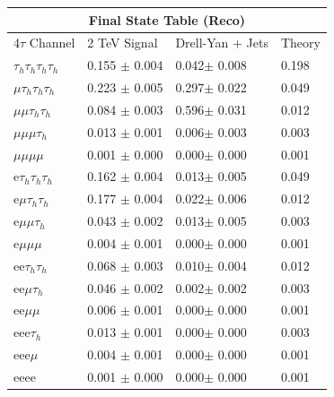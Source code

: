 \documentclass{article}
\begin{document}
 
\begin{landscape} 
\centering 
\begin{tabular}{|p{4.5cm}|p{3cm}|p{3cm}|p{3cm}|}\hline 
\multicolumn{4}{|c|}{Final State Table (Reco)} \\ 
\hline 
4$\tau$ Channel & 2 TeV Signal & Drell-Yan + Jets & Theory \\ 
\hline 
$\tau_h$$\tau_h$$\tau_h$$\tau_h$ & 0.155 $\pm$ 0.004 & 0.042$\pm$ 0.008 & 0.198\\
\hline 
$\mu$$\tau_h$$\tau_h$$\tau_h$ & 0.223 $\pm$ 0.005 & 0.297$\pm$ 0.022 & 0.049\\
\hline 
$\mu$$\mu$$\tau_h$$\tau_h$ & 0.084 $\pm$ 0.003 & 0.596$\pm$ 0.031 & 0.012\\
\hline 
$\mu$$\mu$$\mu$$\tau_h$ & 0.013 $\pm$ 0.001 & 0.006$\pm$ 0.003 & 0.003\\
\hline 
$\mu$$\mu$$\mu$$\mu$ & 0.001 $\pm$ 0.000 & 0.000$\pm$ 0.000 & 0.001\\
\hline 
e$\tau_h$$\tau_h$$\tau_h$ & 0.162 $\pm$ 0.004 & 0.013$\pm$ 0.005 & 0.049\\
\hline 
e$\mu$$\tau_h$$\tau_h$ & 0.177 $\pm$ 0.004 & 0.022$\pm$ 0.006 & 0.012\\
\hline 
e$\mu$$\mu$$\tau_h$ & 0.043 $\pm$ 0.002 & 0.013$\pm$ 0.005 & 0.003\\
\hline 
e$\mu$$\mu$$\mu$ & 0.004 $\pm$ 0.001 & 0.000$\pm$ 0.000 & 0.001\\
\hline 
ee$\tau_h$$\tau_h$ & 0.068 $\pm$ 0.003 & 0.010$\pm$ 0.004 & 0.012\\
\hline 
ee$\mu$$\tau_h$ & 0.046 $\pm$ 0.002 & 0.002$\pm$ 0.002 & 0.003\\
\hline 
ee$\mu$$\mu$ & 0.006 $\pm$ 0.001 & 0.000$\pm$ 0.000 & 0.001\\
\hline 
eee$\tau_h$ & 0.013 $\pm$ 0.001 & 0.000$\pm$ 0.000 & 0.003\\
\hline 
eee$\mu$ & 0.004 $\pm$ 0.001 & 0.000$\pm$ 0.000 & 0.001\\
\hline 
eeee & 0.001 $\pm$ 0.000 & 0.000$\pm$ 0.000 & 0.001\\
\hline 
\end{tabular} 
\end{landscape} 
\end{document}

